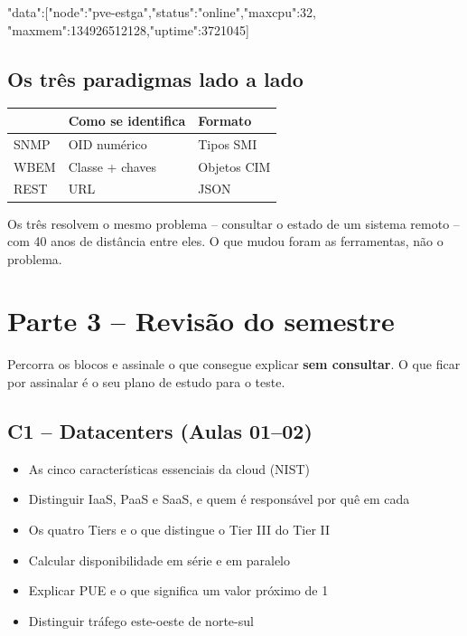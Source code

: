\documentclass[11pt,a4paper]{article}
\begin{document}
\begin{saida}
{"data":[{"node":"pve-estga","status":"online","maxcpu":32,
  "maxmem":134926512128,"uptime":3721045}]}
\end{saida}


\subsection{Os três paradigmas lado a lado}

\begin{center}
\begin{tabular}{@{}lll@{}}
\toprule
 & \textbf{Como se identifica} & \textbf{Formato} \\
\midrule
SNMP & OID numérico & Tipos SMI \\
WBEM & Classe + chaves & Objetos CIM \\
REST & URL & JSON \\
\bottomrule
\end{tabular}
\end{center}

\begin{verificar}
Os três resolvem o mesmo problema -- consultar o estado de um sistema remoto -- com 40 anos de distância entre eles. O que mudou foram as ferramentas, não o problema.
\end{verificar}

\section{Parte 3 -- Revisão do semestre}

Percorra os blocos e assinale o que consegue explicar \textbf{sem consultar}. O que ficar por assinalar é o seu plano de estudo para o teste.

\subsection*{C1 -- Datacenters (Aulas 01--02)}
\begin{itemize}
  \item[$\square$] As cinco características essenciais da cloud (NIST)
  \item[$\square$] Distinguir IaaS, PaaS e SaaS, e quem é responsável por quê em cada
  \item[$\square$] Os quatro Tiers e o que distingue o Tier III do Tier II
  \item[$\square$] Calcular disponibilidade em série e em paralelo
  \item[$\square$] Explicar PUE e o que significa um valor próximo de 1
  \item[$\square$] Distinguir tráfego este-oeste de norte-sul
\end{itemize}
\end{document}
